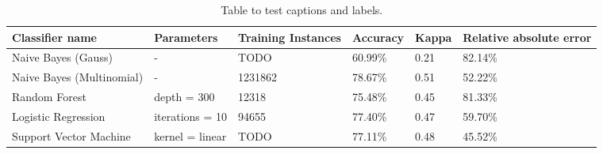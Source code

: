 \begin{table}[]
\centering
\caption{Table to test captions and labels.}
\begin{tabular}{ |p{3cm}||p{3cm}|p{2cm}|p{2cm}|p{2cm}|p{2cm}|  }
 \hline
 Classifier name &          Parameters &             Training Instances &    Accuracy &      Kappa &     Relative absolute error \\
 \hline
 Naive Bayes (Gauss)        &-&            TODO&                 60.99\%&        0.21&       82.14\%\\
  \hline
 Naive Bayes (Multinomial)  &-&                     1231862&                78.67\%&        0.51&       52.22\%\\
  \hline
 Random Forest              &depth = 300&            12318&                 75.48\%&        0.45&       81.33\%\\
  \hline
 Logistic Regression        &iterations = 10&            94655&                 77.40\%&        0.47&       59.70\%\\
  \hline
 Support Vector Machine     &kernel = linear&            TODO&                 77.11\%&        0.48&       45.52\%\\
 \hline
\end{tabular}
\label{tab:evaluations}
\end{table}



